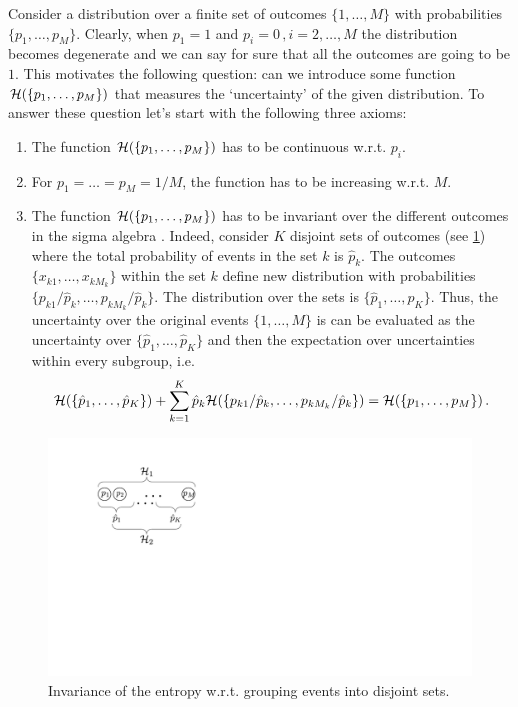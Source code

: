 Consider a distribution over a finite set of outcomes $\{1,\ldots,M\}$ with probabilities $\{p_1,\ldots,p_M\}$. 
Clearly, when $p_1 = 1$ and $p_i = 0\,, i = 2,\ldots, M$ the distribution becomes degenerate and we can say for sure that all the outcomes are going to be $1$.
This motivates the following question: can we introduce some function $\mathcal{H}(\{p_1,\ldots,p_M\})$ that measures the `uncertainty' of the given distribution.
To answer these question let's start with the following three axioms:
\begin{enumerate}
    \item The function $\mathcal{H}(\{p_1,\ldots,p_M\})$ has to be continuous w.r.t. $p_i$. 
    \item For $p_1 = \ldots = p_M = 1/M$, the function has to be increasing w.r.t. $M$. 
    \item The function $\mathcal{H}(\{p_1,\ldots,p_M\})$ has to be invariant over the different outcomes in the sigma algebra . Indeed, consider $K$ disjoint sets of outcomes (see \cref{fig:composability_H}) where the total probability of events in the set $k$ is $\hat{p}_k$. The outcomes $\{x_{k1},\ldots,x_{kM_k}\}$ within the set $k$ define new distribution with probabilities $\{p_{k1}/\hat{p}_k,\ldots,p_{kM_k}/\hat{p}_k\}$.
    The distribution over the sets is $\{\hat{p}_1,\ldots,\hat{p}_K\}$.
    Thus, the uncertainty over the original events $\{1,\ldots,M\}$ is can be evaluated as the uncertainty over $\{\hat{p}_1,\ldots,\hat{p}_K\}$ and then the expectation over uncertainties within every subgroup, i.e.
    \begin{align}
        \mathcal{H}(\{\hat{p}_1,\ldots,\hat{p}_K\}) + \sum_{k=1}^K \hat{p}_k\mathcal{H}(\{p_{k1}/\hat{p}_k,\ldots,p_{kM_k}/\hat{p}_k\}) = \mathcal{H}(\{p_1,\ldots,p_M\})\,.
    \end{align}
\end{enumerate}

\begin{figure}
    \centering
    \includegraphics[width=0.3\linewidth]{pics/composability_H.pdf}
    \caption{Invariance of the entropy w.r.t. grouping events into disjoint sets.}
    \label{fig:composability_H}
\end{figure}

